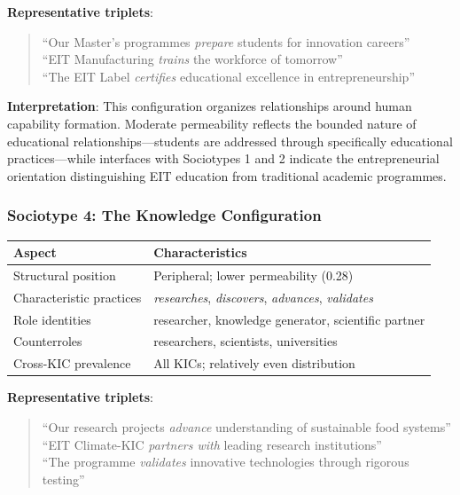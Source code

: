 \documentclass[../main.tex]{subfiles}
\begin{document}
\textbf{Representative triplets}:
\begin{quote}
\small
``Our Master's programmes \textit{prepare} students for innovation careers''\\
``EIT Manufacturing \textit{trains} the workforce of tomorrow''\\
``The EIT Label \textit{certifies} educational excellence in entrepreneurship''
\end{quote}

\textbf{Interpretation}: This configuration organizes relationships around human capability formation. Moderate permeability reflects the bounded nature of educational relationships---students are addressed through specifically educational practices---while interfaces with Sociotypes 1 and 2 indicate the entrepreneurial orientation distinguishing EIT education from traditional academic programmes.

\subsubsection{Sociotype 4: The Knowledge Configuration}

\begin{center}
\small
\begin{tabular}{ll}
\toprule
\textbf{Aspect} & \textbf{Characteristics} \\
\midrule
Structural position & Peripheral; lower permeability (0.28) \\
Characteristic practices & \textit{researches}, \textit{discovers}, \textit{advances}, \textit{validates} \\
Role identities & researcher, knowledge generator, scientific partner \\
Counterroles & researchers, scientists, universities \\
Cross-KIC prevalence & All KICs; relatively even distribution \\
\bottomrule
\end{tabular}
\end{center}

\textbf{Representative triplets}:
\begin{quote}
\small
``Our research projects \textit{advance} understanding of sustainable food systems''\\
``EIT Climate-KIC \textit{partners with} leading research institutions''\\
``The programme \textit{validates} innovative technologies through rigorous testing''
\end{quote}
\end{document}
